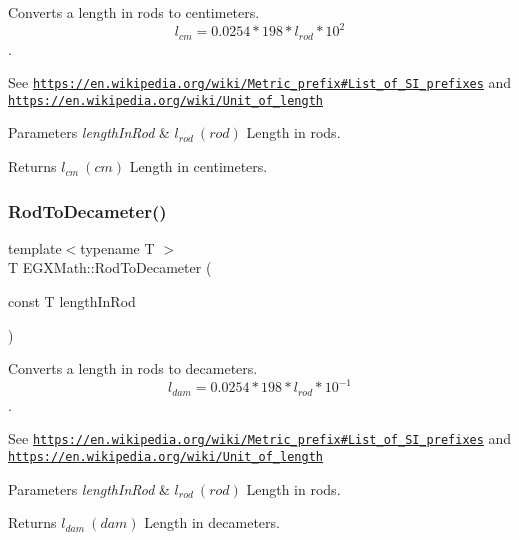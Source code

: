 Converts a length in rods to centimeters. \[ l_{cm}=0.0254 * 198 * l_{rod} * 10^{2} \]. 

See \href{https://en.wikipedia.org/wiki/Metric_prefix#List_of_SI_prefixes}{\tt https\+://en.\+wikipedia.\+org/wiki/\+Metric\+\_\+prefix\#\+List\+\_\+of\+\_\+\+S\+I\+\_\+prefixes} and \href{https://en.wikipedia.org/wiki/Unit_of_length}{\tt https\+://en.\+wikipedia.\+org/wiki/\+Unit\+\_\+of\+\_\+length} 
\begin{DoxyParams}{Parameters}
{\em length\+In\+Rod} & $ l_{rod}\ (rod)$ Length in rods. \\
\hline
\end{DoxyParams}
\begin{DoxyReturn}{Returns}
$ l_{cm}\ (cm)$ Length in centimeters. 
\end{DoxyReturn}
\mbox{\label{group___e_g_x_math-_conversions-_length_conversions-_imperial-_rod-_s_i_gaecb39eb3cc482aa4586ecbce219b6f34}} 
\subsubsection{\texorpdfstring{Rod\+To\+Decameter()}{RodToDecameter()}}
{\footnotesize\ttfamily template$<$typename T $>$ \\
T E\+G\+X\+Math\+::\+Rod\+To\+Decameter (\begin{DoxyParamCaption}\item[{const T}]{length\+In\+Rod }\end{DoxyParamCaption})}



Converts a length in rods to decameters. \[ l_{dam}=0.0254 * 198 * l_{rod} * 10^{-1} \]. 

See \href{https://en.wikipedia.org/wiki/Metric_prefix#List_of_SI_prefixes}{\tt https\+://en.\+wikipedia.\+org/wiki/\+Metric\+\_\+prefix\#\+List\+\_\+of\+\_\+\+S\+I\+\_\+prefixes} and \href{https://en.wikipedia.org/wiki/Unit_of_length}{\tt https\+://en.\+wikipedia.\+org/wiki/\+Unit\+\_\+of\+\_\+length} 
\begin{DoxyParams}{Parameters}
{\em length\+In\+Rod} & $ l_{rod}\ (rod)$ Length in rods. \\
\hline
\end{DoxyParams}
\begin{DoxyReturn}{Returns}
$ l_{dam}\ (dam)$ Length in decameters. 
\end{DoxyReturn}
\mbox{\label{group___e_g_x_math-_conversions-_length_conversions-_imperial-_rod-_s_i_gafaf133f63aeedbfc19093745bd005dca}} 
